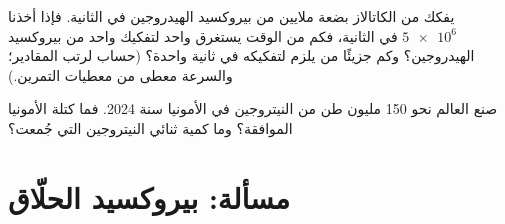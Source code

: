 \begin{exercise}[$\star\star\star$]\label{exo:g12:catalysis:14}
يفكك  من الكاتالاز بضعة ملايين من 
بيروكسيد الهيدروجين في الثانية. فإذا أخذنا $\num{5e6}$ في الثانية، فكم من الوقت
يستغرق   واحد لتفكيك  واحد من بيروكسيد الهيدروجين؟
وكم جزيئًا من  يلزم لتفكيكه في ثانية واحدة؟ (حساب لرتب
المقادير؛ والسرعة معطى من معطيات التمرين.)
\end{exercise}

\begin{exercise}[$\star\star\star$]\label{exo:g12:catalysis:15}
صنع العالم نحو 150 مليون طن من النيتروجين في الأمونيا سنة 2024.
فما كتلة الأمونيا الموافقة؟ وما كمية ثنائي النيتروجين التي جُمعت؟
\end{exercise}

\section{مسألة: بيروكسيد الحلّاق}

